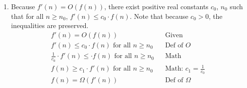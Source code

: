 \documentclass[a4paper]{report}
\DeclarePairedDelimiter{\floor}{\lfloor}{\rfloor}
\begin{document}
\begin{enumerate}
      Given an array $A$ of ints size $n$, initialize the following pseudocode with $countInv(A, 1, n)$: 

      {\bf Pseudocode:}
      \begin{algorithmic}[1]
          \State $count = 0$
            \State $q = \floor{(p+r) / 2}$
            \State $count +=$ countInv($A, p, q$)
            \State $count +=$ countInv($A, (q+1), r$)
            \State $count +=$ main($A, p, q, r$)
          \EndIf
          \State return $count$
        \EndFunction
      \end{algorithmic}

      {\it Pre-Condition:}

       - $p \leq r$

      {\it Post-Condition:}

      - $count$ is the number of inversions in  $A[p \dots r]$

        - $A[p\dots r]$ is a sorted permutation of $A'[p \dots r]$

        - for all $(m < i) \wedge (m > j), A[m] = A'[m]$
      



      {\bf Pseudocode:}
      \begin{algorithmic}[1]
        \EndFunction
      \end{algorithmic}

      {\it Pre-Condition:}

       - $p \leq r$

      {\it Post-Condition:}

       - 





    \par
    \bigskip
    \setcounter{equation}{0}
    
    \item 
      Because $f'(n) = O(f(n))$, there exist positive real constants $c_{0}$, $n_{0}$ such that for all $n \geq n_{0}$, 
      $f'(n) \leq c_{0} \cdot f(n)$. Note that because $c_{0} > 0$, the inequalities are preserved.
    \begin{align}
      f'(n) = O(f(n))                                   &&\text{Given }\\
      f'(n) \leq c_{0} \cdot f(n) \text{ for all } n \geq n_{0}          &&\text{Def of $O$}\\
      \frac{1}{c_{0}} \cdot f'(n) \leq \cdot f(n) \text{ for all } n \geq n_{0}          &&\text{Math}\\
      f(n) \geq c_{1} \cdot f'(n) \text{ for all } n \geq n_{0}          &&\text{Math: $c_{1} = \frac{1}{c_{0}}$}\\
      f(n)  = \Omega(f'(n))                               &&\text{Def of $\Omega$}
    \end{align}


\end{enumerate}
\end{document}
